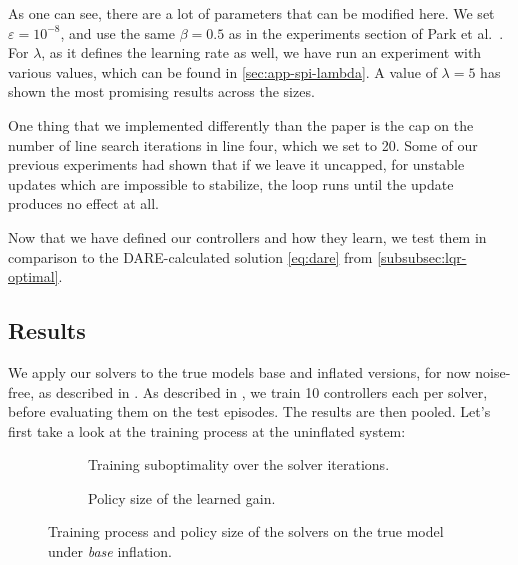 As one can see, there are a lot of parameters that can be modified here. We set $\varepsilon = 10^{-8}$,
and use the same $\beta = 0.5$ as in the experiments section of Park et al.~\cite{Park2020Structured}.
For $\lambda$, as it defines the learning rate as well, we have run an experiment with various values,
which can be found in \cref{sec:app-spi-lambda}. A value of $\lambda = 5$ has shown the most promising results across the sizes.

One thing that we implemented differently than the paper is the cap on the number of line search iterations in line four, which we set to 20.
Some of our previous experiments had shown that if we leave it uncapped, for unstable updates which are impossible
to stabilize, the loop runs until the update produces no effect at all.

Now that we have defined our controllers and how they learn, we test them in comparison to the DARE-calculated
solution \eqref{eq:dare} from \cref{subsubsec:lqr-optimal}.

\subsection{Results}
\label{subsec:known-model-results}

We apply our solvers to the true models base and inflated versions, for now noise-free, as described in . 
As described in , we train 10 controllers each per solver, before evaluating them on the test episodes.
The results are then pooled. Let's first take a look at the training process at the uninflated system:

\begin{figure}[htbp]
  \centering
  \begin{subfigure}[t]{0.49\linewidth}
    \centering
    \caption{Training suboptimality over the solver iterations.}
    \label{fig:ch4-true-base-curves-iterations}
  \end{subfigure}\hfill
  \begin{subfigure}[t]{0.49\linewidth}
    \centering
    \caption{Policy size of the learned gain.}
    \label{fig:ch4-true-base-complexity}
  \end{subfigure}
  \caption{Training process and policy size of the solvers on the true model under
    \emph{base} inflation.}
  \label{fig:ch4-true-base-training}
\end{figure}

